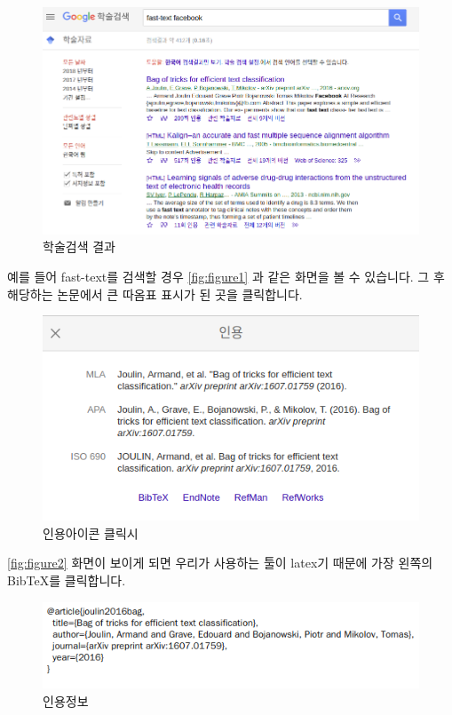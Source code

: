 \documentclass[twocolumn, 10pt]{article}
\begin{document}
\begin{CJK}{UTF8}{}
\begin{figure}[h]
    \centering
    \includegraphics[scale=0.23]{figure/fast-text.png}
    \caption{학술검색 결과}
    \label{fig:figure1}
\end{figure}

예를 들어 fast-text를 검색할 경우 \autoref{fig:figure1} 과 같은 화면을 볼 수 있습니다. 그 후 해당하는 논문에서 큰 따옴표 표시가 된 곳을 클릭합니다.

\begin{figure}[h]
    \centering
    \includegraphics[scale=0.35]{figure/fast-text2.png}
    \caption{인용아이콘 클릭시}
    \label{fig:figure2}
\end{figure}

\autoref{fig:figure2} 화면이 보이게 되면 우리가 사용하는 툴이 latex기 때문에 가장 왼쪽의 BibTeX를 클릭합니다.

\begin{figure}[h]
    \centering
    \includegraphics[scale=0.35]{figure/fast-text3.png}
    \caption{인용정보}
    \label{fig:figure3}
\end{figure}


\end{CJK}
\end{document}

